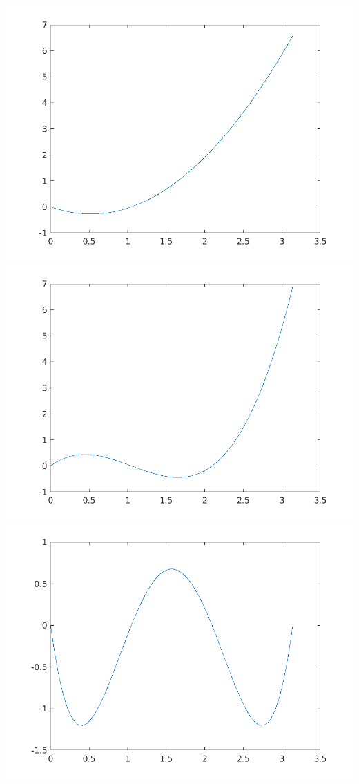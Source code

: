 \documentclass[12pt]{article}
\theoremstyle{homework}
\begin{document}
\includegraphics[scale=0.45]{n2.png}\newline
\includegraphics[scale=0.45]{n3.png}\newline
\includegraphics[scale=0.45]{n4.png}\newline
\end{document}
